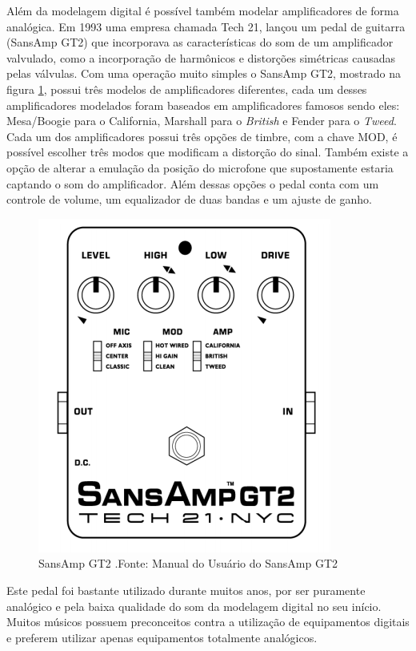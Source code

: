 Além da modelagem digital é possível também modelar amplificadores de forma analógica. Em 1993 uma empresa chamada Tech 21, lançou um pedal de guitarra (SansAmp GT2) que incorporava as características do som de um amplificador valvulado, como a incorporação de harmônicos e distorções simétricas causadas pelas válvulas. Com uma operação muito simples o SansAmp GT2, mostrado na figura \ref{fig:sansamp}, possui três modelos de amplificadores diferentes, cada um desses amplificadores modelados foram baseados em amplificadores famosos sendo eles: Mesa/Boogie para o California, Marshall para o \textit{British} e Fender para o \textit{Tweed}. Cada um dos amplificadores possui três opções de timbre, com a chave MOD, é possível escolher três modos que modificam a distorção do sinal. Também existe a opção de alterar a emulação da posição do microfone que supostamente estaria captando o som do amplificador. Além dessas opções o pedal conta com um controle de volume, um equalizador de duas bandas e um ajuste de ganho.
\begin{figure}[!htb]
	\centering
	\includegraphics[width=0.7\linewidth]{figuras/SanSamp}
	\caption{SansAmp GT2 .Fonte: Manual do Usuário do SansAmp GT2}
	\label{fig:sansamp}
\end{figure}

Este pedal foi bastante utilizado durante muitos anos, por ser puramente analógico e pela baixa qualidade do som da modelagem digital no seu início. Muitos músicos possuem preconceitos contra a utilização de equipamentos digitais e preferem utilizar apenas equipamentos totalmente analógicos.


